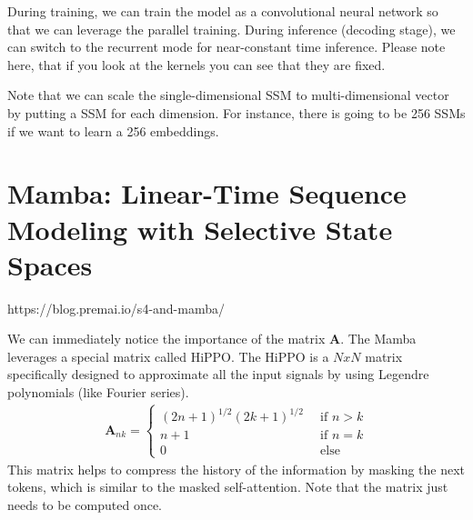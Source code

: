 During training, we can train the model as a convolutional neural network so that we can leverage the parallel training. During inference (\ie decoding stage), we can switch to the recurrent mode for near-constant time inference. Please note here, that if you look at the kernels you can see that they are fixed. 

Note that we can scale the single-dimensional SSM to multi-dimensional vector by putting a SSM for each dimension. For instance, there is going to be 256 SSMs if we want to learn a 256 embeddings.  


\section{Mamba: Linear-Time Sequence Modeling with Selective State Spaces}
\label{sec:ssm_mamba}
https://blog.premai.io/s4-and-mamba/

We can immediately notice the importance of the matrix $\mathbf{A}$. The Mamba leverages a special matrix called HiPPO. The HiPPO is a $N x N$ matrix specifically designed to approximate all the input signals by using Legendre polynomials (like Fourier series). 
\begin{align*}
	\mathbf{A}_{nk} = 
\begin{cases}
	(2n+1)^{1/2}(2k+1)^{1/2}\, &\textrm{ if } n>k\\
	n+1\, &\textrm{ if } n=k\\
	0\, &\textrm{ else }
\end{cases}
\end{align*}
This matrix helps to compress the history of the information by masking the next tokens, which is similar to the masked self-attention. Note that the matrix just needs to be computed once. 


